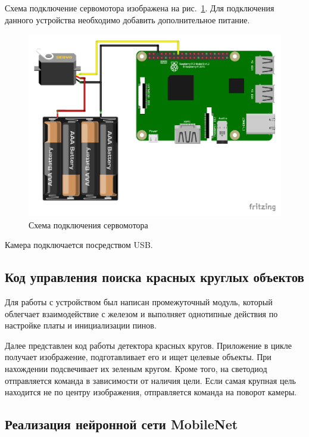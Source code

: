 \documentclass[a4paper,14pt]{article}
\begin{document}
    Схема подключение сервомотора изображена на рис.~\ref{fig:servo}.
    Для подключения данного устройства необходимо добавить дополнительное питание.

    \begin{figure}[H]
        \centering
        \includegraphics[width=0.95\linewidth]{schemas/servo_bb}
        \caption{Схема подключения сервомотора}
        \label{fig:servo}
    \end{figure}

    Камера подключается посредством USB.

    \subsection{Код управления поиска красных круглых объектов}

    Для работы с устройством был написан промежуточный модуль, который облегчает взаимодействие с железом и выполняет однотипные действия по настройке платы и инициализации пинов.

    {\small {}}

    Далее представлен код работы детектора красных кругов.
    Приложение в цикле получает изображение, подготавливает его и ищет целевые объекты.
    При нахождении подсвечивает их зеленым кругом.
    Кроме того, на светодиод отправляется команда в зависимости от наличия цели.
    Если самая крупная цель находится не по центру изображения, отправляется команда на поворот камеры.

    {\small {}}

    \subsection{Реализация нейронной сети MobileNet}
\end{document}
